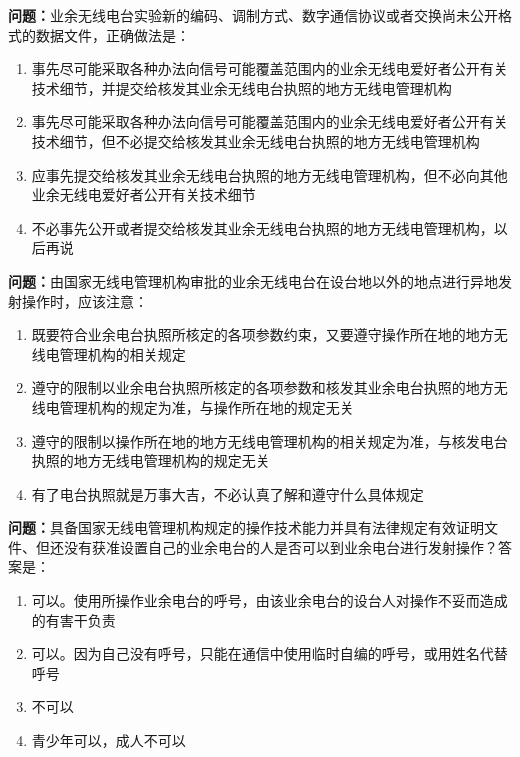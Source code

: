 \bigskip


\noindent\textbf{问题：}业余无线电台实验新的编码、调制方式、数字通信协议或者交换尚未公开格式的数据文件，正确做法是：
\begin{enumerate}[label=\Alph*), leftmargin=3em]
\item 事先尽可能采取各种办法向信号可能覆盖范围内的业余无线电爱好者公开有关技术细节，并提交给核发其业余无线电台执照的地方无线电管理机构
\item 事先尽可能采取各种办法向信号可能覆盖范围内的业余无线电爱好者公开有关技术细节，但不必提交给核发其业余无线电台执照的地方无线电管理机构
\item 应事先提交给核发其业余无线电台执照的地方无线电管理机构，但不必向其他业余无线电爱好者公开有关技术细节
\item 不必事先公开或者提交给核发其业余无线电台执照的地方无线电管理机构，以后再说
\end{enumerate}

\bigskip


\noindent\textbf{问题：}由国家无线电管理机构审批的业余无线电台在设台地以外的地点进行异地发射操作时，应该注意：
\begin{enumerate}[label=\Alph*), leftmargin=3em]
\item 既要符合业余电台执照所核定的各项参数约束，又要遵守操作所在地的地方无线电管理机构的相关规定
\item 遵守的限制以业余电台执照所核定的各项参数和核发其业余电台执照的地方无线电管理机构的规定为准，与操作所在地的规定无关
\item 遵守的限制以操作所在地的地方无线电管理机构的相关规定为准，与核发电台执照的地方无线电管理机构的规定无关
\item 有了电台执照就是万事大吉，不必认真了解和遵守什么具体规定
\end{enumerate}

\bigskip


\noindent\textbf{问题：}具备国家无线电管理机构规定的操作技术能力并具有法律规定有效证明文件、但还没有获准设置自己的业余电台的人是否可以到业余电台进行发射操作？答案是：
\begin{enumerate}[label=\Alph*), leftmargin=3em]
\item 可以。使用所操作业余电台的呼号，由该业余电台的设台人对操作不妥而造成的有害干负责
\item 可以。因为自己没有呼号，只能在通信中使用临时自编的呼号，或用姓名代替呼号
\item 不可以
\item 青少年可以，成人不可以
\end{enumerate}

